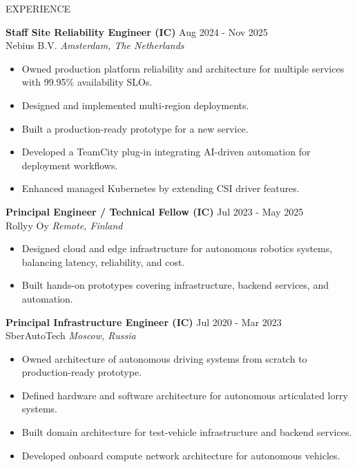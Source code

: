 \documentclass{resume} %
\begin{document}
\begin{rSection}{EXPERIENCE}

\textbf{Staff Site Reliability Engineer (IC)} \hfill Aug 2024 - Nov 2025\\
Nebius B.V. \hfill \textit{Amsterdam, The Netherlands}
\begin{itemize}
	\itemsep -3pt {}
	\item Owned production platform reliability and architecture for multiple services with 99.95\% availability SLOs.
	\item Designed and implemented multi-region deployments.
	\item Built a production-ready prototype for a new service.
	\item Developed a TeamCity plug-in integrating AI-driven automation for deployment workflows.
	\item Enhanced managed Kubernetes by extending CSI driver features.
\end{itemize}

\textbf{Principal Engineer / Technical Fellow (IC)} \hfill Jul 2023 - May 2025\\
Rollyy Oy \hfill \textit{Remote, Finland}
\begin{itemize}
	\item Designed cloud and edge infrastructure for autonomous robotics systems, balancing latency, reliability, and cost.
	\item Built hands-on prototypes covering infrastructure, backend services, and automation.
\end{itemize}

\textbf{Principal Infrastructure Engineer (IC)} \hfill Jul 2020 - Mar 2023\\
SberAutoTech \hfill \textit{Moscow, Russia}
\begin{itemize}
   \itemsep -3pt {}
   \item Owned architecture of autonomous driving systems from scratch to production-ready prototype.
   \item Defined hardware and software architecture for autonomous articulated lorry systems.
   \item Built domain architecture for test-vehicle infrastructure and backend services.
   \item Developed onboard compute network architecture for autonomous vehicles.
\end{itemize}


\end{rSection}
\end{document}
